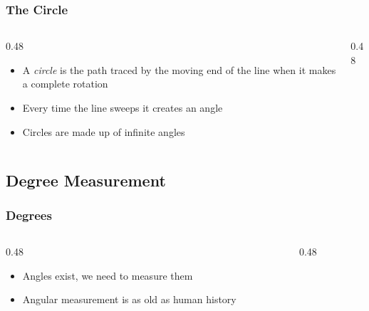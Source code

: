 \begin{frame}
	\frametitle{The Circle}

    \begin{columns}
        \begin{column}{0.48\linewidth}
            \begin{itemize}[<+- | alert@+>]
                \item A \emph{circle} is the path traced by the moving end of the line when it makes a complete rotation
                \item Every time the line sweeps it creates an angle
                \item Circles are made up of infinite angles
            \end{itemize} 
        \end{column}
        \begin{column}{0.48\linewidth}
            \centering
            \resizebox{\linewidth}{!}{
                
            }
        \end{column}
    \end{columns}
\end{frame}

\subsection{Degree Measurement}

\begin{frame}
	\frametitle{Degrees}

    \begin{columns}
        \begin{column}{0.48\linewidth}
            \begin{itemize}[<+- | alert@+>]
                \item Angles exist, we need to measure them
                \item Angular measurement is as old as human history
            \end{itemize} 
        \end{column}
        \begin{column}{0.48\linewidth}
        \end{column}
    \end{columns}
\end{frame}


